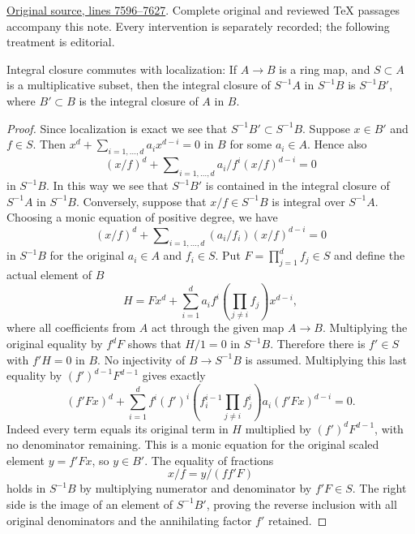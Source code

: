 \noindent\href{https://github.com/stacks/stacks-project/blob/a04446e57ec1fbc252a871afcec7752fb2807b14/algebra.tex\#L7596}{Original source, lines 7596--7627}. Complete original and reviewed TeX passages accompany this note. Every intervention is separately recorded; the following treatment is editorial.


\begin{lemma}
\label{editorial-source-lemma-integral-closure-localize}
Integral closure commutes with localization: If $A \to B$ is a ring
map, and $S \subset A$ is a multiplicative subset, then the integral
closure of $S^{-1}A$ in $S^{-1}B$ is $S^{-1}B'$, where $B' \subset B$
is the integral closure of $A$ in $B$.
\end{lemma}

\begin{proof}
Since localization is exact we see that $S^{-1}B' \subset S^{-1}B$.
Suppose $x \in B'$ and $f \in S$. Then
$x^d + \sum_{i = 1, \ldots, d} a_i x^{d - i} = 0$
in $B$ for some $a_i \in A$. Hence also
$$
(x/f)^d + \sum\nolimits_{i = 1, \ldots, d} a_i/f^i (x/f)^{d - i} = 0
$$
in $S^{-1}B$. In this way we see that $S^{-1}B'$ is contained in
the integral closure of $S^{-1}A$ in $S^{-1}B$. Conversely, suppose
that $x/f \in S^{-1}B$ is integral over $S^{-1}A$. Choosing a monic equation of positive degree, we have
$$
(x/f)^d + \sum\nolimits_{i = 1, \ldots, d} (a_i/f_i) (x/f)^{d - i} = 0
$$
in $S^{-1}B$ for the original $a_i\in A$ and $f_i\in S$.
Put $F=\prod_{j=1}^d f_j\in S$ and define the actual element of $B$
$$
H=Fx^d+\sum_{i=1}^d a_i f^i
\left(\prod_{j\ne i}f_j\right)x^{d-i},
$$
where all coefficients from $A$ act through the given map $A\to B$.
Multiplying the original equality by $f^dF$ shows that $H/1=0$
in $S^{-1}B$. Therefore there is $f'\in S$ with $f'H=0$ in $B$.
No injectivity of $B\to S^{-1}B$ is assumed. Multiplying this
last equality by $(f')^{d-1}F^{d-1}$ gives exactly
$$
(f'Fx)^d+
\sum_{i=1}^d f^i(f')^i
\left(f_i^{i-1}\prod_{j\ne i}f_j^i\right)a_i
(f'Fx)^{d-i}=0.
$$
Indeed every term equals its original term in $H$ multiplied by
$(f')^dF^{d-1}$, with no denominator remaining. This is a monic
equation for the original scaled element $y=f'Fx$, so $y\in B'$.
The equality of fractions
$$
x/f=y/(ff'F)
$$
holds in $S^{-1}B$ by multiplying numerator and denominator by
$f'F\in S$. The right side is the image of an element of
$S^{-1}B'$, proving the reverse inclusion with all original
denominators and the annihilating factor $f'$ retained.
\end{proof}


